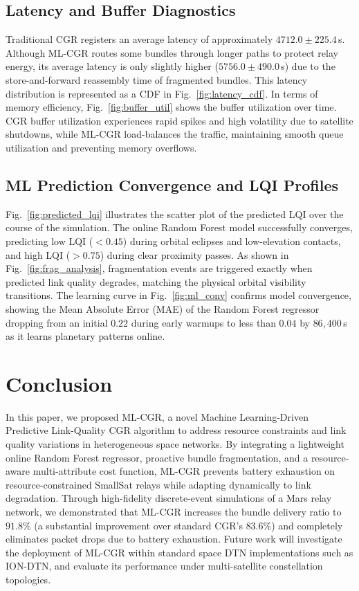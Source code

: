 \documentclass[a4paper,fleqn]{cas-dc}
\newcommand{\mlcgr}{\textsf{ML-CGR}}
\begin{document}
\subsection{Latency and Buffer Diagnostics}
Traditional CGR registers an average latency of approximately $4712.0 \pm 225.4\,$s. Although \mlcgr{} routes some bundles through longer paths to protect relay energy, its average latency is only slightly higher ($5756.0 \pm 490.0\,$s) due to the store-and-forward reassembly time of fragmented bundles. This latency distribution is represented as a CDF in Fig.~\ref{fig:latency_cdf}.
In terms of memory efficiency, Fig.~\ref{fig:buffer_util} shows the buffer utilization over time. CGR buffer utilization experiences rapid spikes and high volatility due to satellite shutdowns, while \mlcgr{} load-balances the traffic, maintaining smooth queue utilization and preventing memory overflows.

\subsection{ML Prediction Convergence and LQI Profiles}
Fig.~\ref{fig:predicted_lqi} illustrates the scatter plot of the predicted LQI over the course of the simulation. The online Random Forest model successfully converges, predicting low LQI ($<0.45$) during orbital eclipses and low-elevation contacts, and high LQI ($>0.75$) during clear proximity passes. As shown in Fig.~\ref{fig:frag_analysis}, fragmentation events are triggered exactly when predicted link quality degrades, matching the physical orbital visibility transitions.
The learning curve in Fig.~\ref{fig:ml_conv} confirms model convergence, showing the Mean Absolute Error (MAE) of the Random Forest regressor dropping from an initial $0.22$ during early warmups to less than $0.04$ by $86{,}400\,$s as it learns planetary patterns online.



\section{Conclusion}
\label{sec:conclusion}
In this paper, we proposed \mlcgr{}, a novel Machine Learning-Driven Predictive Link-Quality CGR algorithm to address resource constraints and link quality variations in heterogeneous space networks. By integrating a lightweight online Random Forest regressor, proactive bundle fragmentation, and a resource-aware multi-attribute cost function, \mlcgr{} prevents battery exhaustion on resource-constrained SmallSat relays while adapting dynamically to link degradation. Through high-fidelity discrete-event simulations of a Mars relay network, we demonstrated that \mlcgr{} increases the bundle delivery ratio to $91.8\%$ (a substantial improvement over standard CGR's $83.6\%$) and completely eliminates packet drops due to battery exhaustion. Future work will investigate the deployment of \mlcgr{} within standard space DTN implementations such as ION-DTN, and evaluate its performance under multi-satellite constellation topologies.



\end{document}
